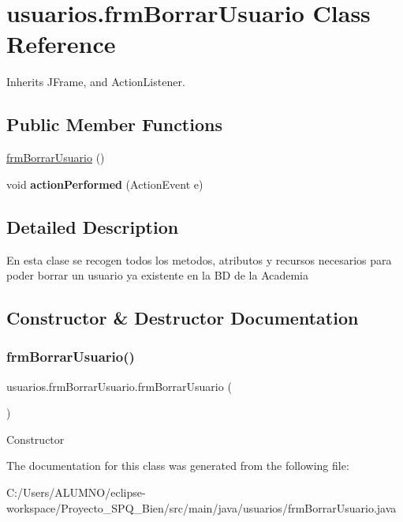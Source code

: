 \hypertarget{classusuarios_1_1frm_borrar_usuario}{}\section{usuarios.\+frm\+Borrar\+Usuario Class Reference}
\label{classusuarios_1_1frm_borrar_usuario}


Inherits J\+Frame, and Action\+Listener.

\subsection*{Public Member Functions}
\begin{DoxyCompactItemize}
\item 
\hyperlink{classusuarios_1_1frm_borrar_usuario_aa20fa3f97e50deb5b36bdfd400cca458}{frm\+Borrar\+Usuario} ()
\item 
\mbox{\label{classusuarios_1_1frm_borrar_usuario_ac795d08062fb685d845ed058efe85d92}} 
void {\bfseries action\+Performed} (Action\+Event e)
\end{DoxyCompactItemize}


\subsection{Detailed Description}
En esta clase se recogen todos los metodos, atributos y recursos necesarios para poder borrar un usuario ya existente en la BD de la Academia 

\subsection{Constructor \& Destructor Documentation}
\mbox{\label{classusuarios_1_1frm_borrar_usuario_aa20fa3f97e50deb5b36bdfd400cca458}} 
\subsubsection{\texorpdfstring{frm\+Borrar\+Usuario()}{frmBorrarUsuario()}}
{\footnotesize\ttfamily usuarios.\+frm\+Borrar\+Usuario.\+frm\+Borrar\+Usuario (\begin{DoxyParamCaption}{ }\end{DoxyParamCaption})}

Constructor 

The documentation for this class was generated from the following file\+:\begin{DoxyCompactItemize}
\item 
C\+:/\+Users/\+A\+L\+U\+M\+N\+O/eclipse-\/workspace/\+Proyecto\+\_\+\+S\+P\+Q\+\_\+Bien/src/main/java/usuarios/frm\+Borrar\+Usuario.\+java\end{DoxyCompactItemize}
